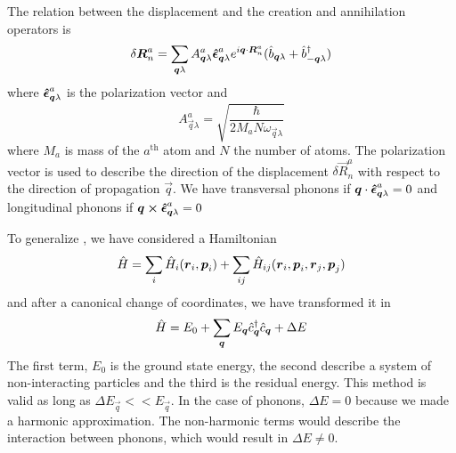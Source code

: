 The relation between the displacement and the creation and annihilation operators is
\begin{equation} \label{eq:phonon_coordinates}
    \delta \mathbf{\boldsymbol{R}}_n^a = \sum_{\mathbf{\boldsymbol{q}}\lambda} A_{\mathbf{\boldsymbol{q}}\lambda}^a \mathbf{\boldsymbol{\hat{\epsilon}}}_{\mathbf{\boldsymbol{q}}\lambda}^a e^{i\mathbf{\boldsymbol{q}} \cdot \mathbf{\boldsymbol{R}}_n^a} (\hat{b}_{\mathbf{\boldsymbol{q}}\lambda} + \hat{b}^\dagger_{-\mathbf{\boldsymbol{q}}\lambda})
\end{equation}
where $\mathbf{\boldsymbol{\hat{\epsilon}}}_{\mathbf{\boldsymbol{q}}\lambda}^a$ is the polarization vector and
\begin{equation} \label{eq:A_phonon_constant}
    A_{\vec{q}\lambda}^a = \sqrt{\frac{\hbar}{2M_aN\omega_{\vec{q}\lambda}}}
\end{equation}
where $M_a$ is mass of the $a^\text{th}$ atom and $N$ the number of atoms. The polarization vector is used to describe the direction of the displacement $\delta \vec{R}_n^a$ with respect to the direction of propagation $\vec{q}$. We have transversal phonons if $\mathbf{\boldsymbol{q}} \cdot \mathbf{\boldsymbol{\hat{\epsilon}}}_{\mathbf{\boldsymbol{q}}\lambda}^a = 0$ and longitudinal phonons if $\mathbf{\boldsymbol{q}} \cross \mathbf{\boldsymbol{\hat{\epsilon}}}_{\mathbf{\boldsymbol{q}}\lambda}^a = 0$

To generalize \cite{cohenFundamentalsCondensedMatter}, we have considered a Hamiltonian
\begin{equation}
    \hat{H} = \sum_i \hat{H}_i(\mathbf{\boldsymbol{r}}_i, \mathbf{\boldsymbol{p}}_i) + \sum_{ij} \hat{H}_{ij}(\mathbf{\boldsymbol{r}}_i, \mathbf{\boldsymbol{p}}_i, \mathbf{\boldsymbol{r}}_j, \mathbf{\boldsymbol{p}}_j)
\end{equation}
and after a canonical change of coordinates, we have transformed it in
\begin{equation}
    \hat{H} = E_0 + \sum_{\mathbf{\boldsymbol{q}}} E_{\mathbf{\boldsymbol{q}}} \hat{c}^\dagger_{\mathbf{\boldsymbol{q}}}\hat{c}_{\mathbf{\boldsymbol{q}}} + \Delta E
\end{equation}
The first term, $E_0$ is the ground state energy, the second describe a system of non-interacting particles and the third is the residual energy. This method is valid as long as $\Delta E_\vec{q} << E_\vec{q}$. In the case of phonons, $\Delta E = 0$ because we made a harmonic approximation. The non-harmonic terms would describe the interaction between phonons, which would result in $\Delta E \neq 0$.

